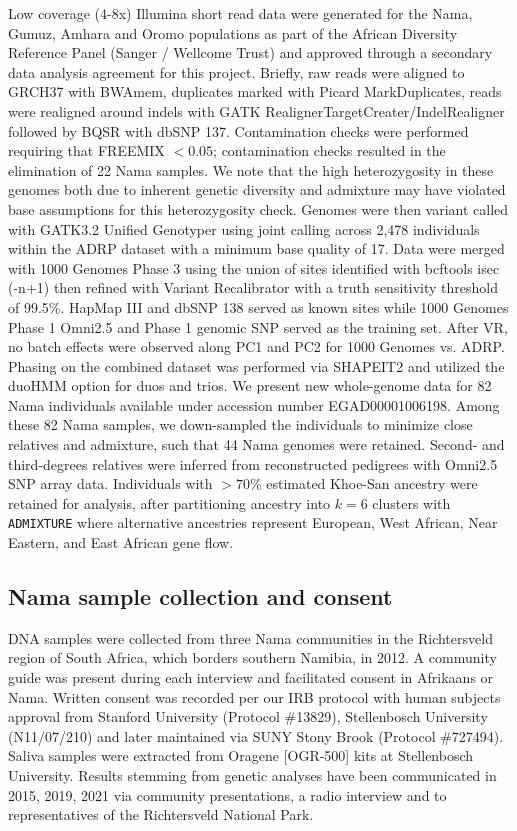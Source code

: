 \documentclass[]{article}
\begin{document}
Low coverage (4-8x) Illumina short read data were generated for the Nama,
Gumuz, Amhara and Oromo populations as part of the African Diversity Reference
Panel (Sanger / Wellcome Trust) \citep{Gurdasani2015-qy,Pagani2015-pz} and
approved through a secondary data analysis agreement for this project. Briefly,
raw reads were aligned to GRCH37 with BWAmem, duplicates
marked with Picard MarkDuplicates, reads were realigned around indels with GATK
RealignerTargetCreater/IndelRealigner followed by BQSR with dbSNP 137.
Contamination checks were performed requiring that FREEMIX $<0.05$;
contamination checks resulted in the elimination of 22 Nama samples. We note
that the high heterozygosity in these genomes both due to inherent genetic
diversity and admixture may have violated base assumptions for this
heterozygosity check. Genomes were then variant called with GATK3.2 Unified
Genotyper \citep{DePristo2011-up} using joint calling across 2,478 individuals within
the ADRP dataset with a minimum base quality of 17. Data were merged with 1000
Genomes Phase 3 \citep{1000_Genomes_Project_Consortium2015-zq} using the union
of sites identified with bcftools isec (-n+1) \citep{Danecek2021-kc} then refined
with Variant Recalibrator with a truth sensitivity threshold of 99.5\%. HapMap
III and dbSNP 138 served as known sites while 1000 Genomes Phase 1 Omni2.5 and
Phase 1 genomic SNP served as the training set. After VR, no batch effects were
observed along PC1 and PC2 for 1000 Genomes vs. ADRP. Phasing on the combined
dataset was performed via SHAPEIT2 \citep{Delaneau2013-aw} and utilized the duoHMM
option for duos and trios. We present new whole-genome data for 82 Nama individuals 
available under accession number EGAD00001006198.
Among these 82 Nama samples, we down-sampled the individuals to minimize
close relatives and admixture, such that 44 Nama genomes were retained.
Second- and third-degrees relatives were inferred from reconstructed
pedigrees with Omni2.5 SNP array data.
Individuals with $>70\%$ estimated Khoe-San ancestry were retained for
analysis, after partitioning ancestry into $k=6$ clusters with \texttt{ADMIXTURE}
\citep{Alexander2009-sw} where alternative ancestries represent European, West
African, Near Eastern, and East African gene flow. 

\subsection{Nama sample collection and consent}

DNA samples were collected from three Nama communities in the Richtersveld
region of South Africa, which borders southern Namibia, in 2012. A community
guide was present during each interview and facilitated consent in Afrikaans or
Nama. Written consent was recorded per our IRB protocol with human subjects
approval from Stanford University (Protocol \#13829), Stellenbosch University
(N11/07/210) and later maintained via SUNY Stony Brook (Protocol \#727494).
Saliva samples were extracted from Oragene [OGR-500] kits at Stellenbosch
University. Results stemming from genetic analyses have been communicated in
2015, 2019, 2021 via community presentations, a radio interview and to
representatives of the Richtersveld National Park.
\end{document}
